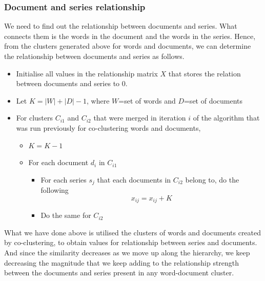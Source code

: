 \documentclass[11pt]{article}
\begin{document}
\subsubsection{Document and series relationship}
We need to find out the relationship between documents and series. What connects them is the words in the document and the words in the series. Hence, from the clusters generated above for words and documents, we can determine the relationship between documents and series as follows.
\begin{itemize}
\item
  Initialise all values in the relationship matrix $X$ that stores the relation between documents and series to $0$.
\item
  Let $K=|W|+|D|-1$, where $W$=set of words and $D$=set of documents
\item
  For clusters $C_{i1}$ and $C_{i2}$ that were merged in iteration $i$ of the algorithm that was run previously for co-clustering words and documents,
  \begin{itemize}
  \item
    $K=K-1$
  \item
    For each document $d_i$ in $C_{i1}$
    \begin{itemize}
  \item
    For each series $s_j$ that each documents in $C_{i2}$ belong to, do the following
        $$x_{ij}=x_{ij}+K$$
\item
      Do the same for $C_{i2}$
\end{itemize}
  \end{itemize}
\end{itemize}
What we have done above is utilised the clusters of words and documents created by co-clustering, to obtain values for relationship between series and documents. And since the similarity decreases as we move up along the hierarchy, we keep decreasing the magnitude that we keep adding to the relationship strength between the documents and series present in any word-document cluster.
\end{document}
